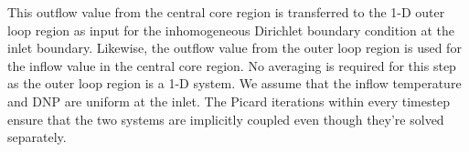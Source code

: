 This outflow value from the central core region is transferred to the 1-D
outer loop region as input for the inhomogeneous Dirichlet boundary
condition at the inlet boundary. Likewise, the outflow value from the outer
loop region is used for the inflow value in the central core region. No
averaging is required for this step as the outer loop region is a 1-D system.
We assume that the inflow temperature and \gls{DNP} are uniform at the inlet.
The Picard iterations within every timestep ensure that the two systems are
implicitly coupled even though they're solved separately.
